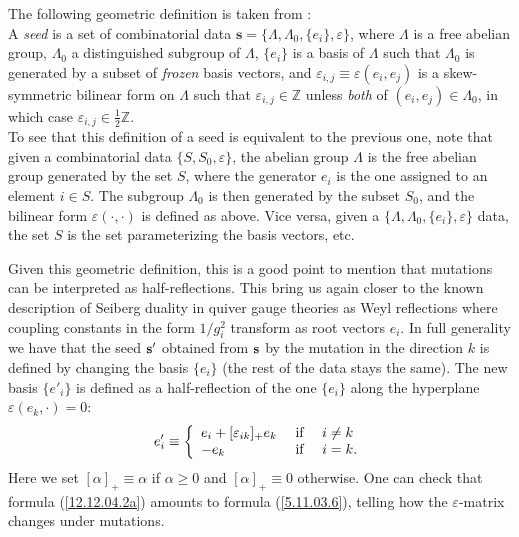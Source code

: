 \documentclass[12pt,hyperref,compress]{JHEP3}
\newcommand{\eq}[1]{\begin{equation}#1\end{equation}}
\begin{document}
The following geometric definition is taken from \cite{FG2}:\\[-7pt]

 A {\it seed} is a set of combinatorial data $\mathbf{s}\!=\!\big\{\Lambda,\Lambda_0,\{e_i\},\varepsilon\big\}$, where $\Lambda$ is a free abelian group, $\Lambda_0$ a distinguished subgroup of $\Lambda$, $\{e_i\}$ is a basis of $\Lambda$ such that $\Lambda_0$ is generated by a subset of {\it frozen} basis vectors, and $\varepsilon_{i,j}\!\equiv\!\varepsilon(e_i,e_j)$ is a skew-symmetric bilinear form on $\Lambda$ such that $\varepsilon_{i,j}\!\in\!\mathbb{Z}$ unless {\it both} of $(e_i,e_j)\!\in\!\Lambda_0$, in which case $\varepsilon_{i,j}\in\frac{1}{2}\mathbb{Z}$. \\[-7pt]

To see that this definition of a seed is equivalent to the previous one, note that given a combinatorial data $\{S,S_0,\varepsilon\}$, the abelian group $\Lambda$ is the free abelian group generated by the set $S$, where the generator $e_i$ is the one assigned to an element $i\!\in\!S$.  The subgroup $\Lambda_0$ is then generated by the subset $S_0$, and the bilinear form $\varepsilon(\cdot,\cdot)$ is defined as above. Vice versa,
given a $\{\Lambda, \Lambda_0, \{e_i\}, \varepsilon\}$ data, the set $S$ is the set parameterizing the basis vectors, etc.

Given this geometric definition, this is a good point to mention that mutations can be interpreted as half-reflections. This bring us again closer to the known description of Seiberg duality in quiver gauge theories as Weyl reflections where coupling constants in the form $1/g_i^2$ transform as root vectors $e_i$. In full generality we have that the  seed ${\bf s}'$ obtained from ${\bf s}$ by the mutation in the direction $k$ is defined by changing the basis $\{e_i\}$ (the rest of the data stays the same). The new basis $\{e'_i\}$ is defined as a half-reflection of the one $\{e_i\}$ along the hyperplane $\varepsilon(e_k, \cdot)=0$:
\vspace{-.2cm}\eq{e'_i\equiv\left\{ \begin{array}{lll} e_i + [\varepsilon_{ik}]_+e_k& \mbox{ if } &  i\not = k\\-e_k& \mbox{ if } &  i = k.\end{array}\right.\label{12.12.04.2a}\vspace{-.2cm}}
Here we set  $[\alpha]_+\equiv\alpha$ if $\alpha\geq 0$ and $[\alpha]_+\equiv0$ otherwise. One can check that formula (\ref{12.12.04.2a}) amounts to formula (\ref{5.11.03.6}), telling how the $\varepsilon$-matrix changes under mutations.
\end{document}
